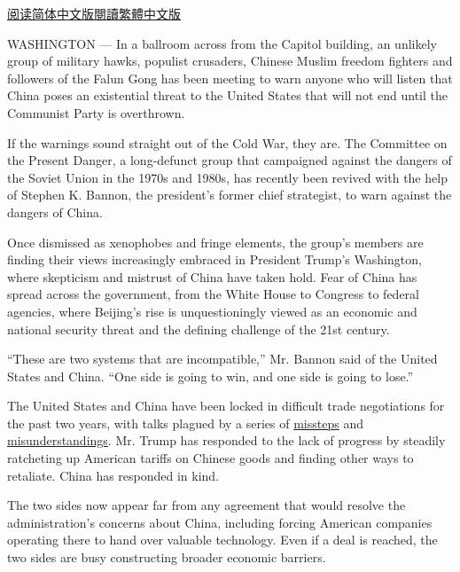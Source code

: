 \href{https://cn.nytimes.com/usa/20190722/china-red-scare-washington/}{阅读简体中文版}\href{https://cn.nytimes.com/usa/20190722/china-red-scare-washington/zh-hant/}{閱讀繁體中文版}

WASHINGTON --- In a ballroom across from the Capitol building, an
unlikely group of military hawks, populist crusaders, Chinese Muslim
freedom fighters and followers of the Falun Gong has been meeting to
warn anyone who will listen that China poses an existential threat to
the United States that will not end until the Communist Party is
overthrown.

If the warnings sound straight out of the Cold War, they are. The
Committee on the Present Danger, a long-defunct group that campaigned
against the dangers of the Soviet Union in the 1970s and 1980s, has
recently been revived with the help of Stephen K. Bannon, the
president's former chief strategist, to warn against the dangers of
China.

Once dismissed as xenophobes and fringe elements, the group's members
are finding their views increasingly embraced in President Trump's
Washington, where skepticism and mistrust of China have taken hold. Fear
of China has spread across the government, from the White House to
Congress to federal agencies, where Beijing's rise is unquestioningly
viewed as an economic and national security threat and the defining
challenge of the 21st century.

``These are two systems that are incompatible,'' Mr. Bannon said of the
United States and China. ``One side is going to win, and one side is
going to lose.''

The United States and China have been locked in difficult trade
negotiations for the past two years, with talks plagued by a series of
\href{https://www.nytimes.com/2019/05/06/us/politics/trump-tariffs-china.html}{missteps}
and
\href{https://www.nytimes.com/2019/07/10/us/politics/us-china-trade-war.html?rref=collection\%2Fbyline\%2Fana-swanson\&action=click\&contentCollection=undefined\&region=stream\&module=stream_unit\&version=latest\&contentPlacement=2\&pgtype=collection}{misunderstandings}.
Mr. Trump has responded to the lack of progress by steadily ratcheting
up American tariffs on Chinese goods and finding other ways to
retaliate. China has responded in kind.

The two sides now appear far from any agreement that would resolve the
administration's concerns about China, including forcing American
companies operating there to hand over valuable technology. Even if a
deal is reached, the two sides are busy constructing broader economic
barriers.

